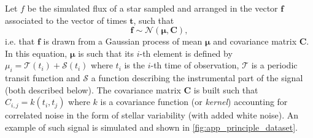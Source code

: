 \documentclass{aastex631}
\begin{document}
\noindent Let $f$ be the simulated flux of a star sampled and arranged in the vector $\bm{f}$ associated to the vector of times $\bm{t}$, such that
\begin{equation*}
    \bm{f} \sim \mathcal{N}(\bm{\mu}, \bm{C}),
\end{equation*}
i.e. that $\bm{f}$ is drawn from a Gaussian process of mean $\bm{\mu}$ and covariance matrix $\bm{C}$. In this equation, $\bm{\mu}$ is such that its $i$-th element is defined by  $\mu_i = \mathcal{T}(t_i) + \mathcal{S}(t_i)$ where $t_i$ is the $i$-th time of observation, $\mathcal{T}$ is a periodic transit function and $\mathcal{S}$ a function describing the instrumental part of the signal (both described below). The covariance matrix $\bm{C}$ is built such that $C_{i, j} = k(t_i, t_j)$ where $k$ is a covariance function (or \textit{kernel}) accounting for correlated noise in the form of stellar variability (with added white noise). An example of such signal is simulated and shown in \autoref{fig:app_principle_dataset}.
\end{document}
